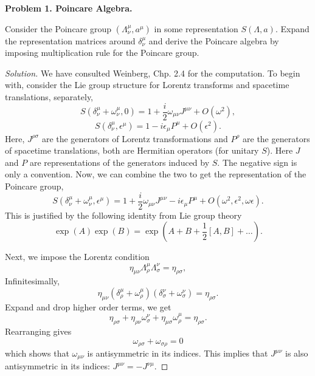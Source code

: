 
\textbf{Problem 1. Poincare Algebra.}

Consider the Poincare group $(\Lambda^\mu_ \nu, a^\mu)$ in some representation $S(\Lambda, a)$. Expand the representation matrices around $\delta^\mu _ \nu$ and derive the Poincare algebra by imposing multiplication rule for the Poincare group.

\begin{proof}[Solution]
	We have consulted Weinberg, Chp. 2.4 for the computation. To begin with, consider the Lie group structure for Lorentz transforms and spacetime translations, separately,
	\[
	S(\delta^\mu _ \nu + \omega^\mu _ \nu, 0) = 1 + \frac{i}{2} \omega_{\mu \nu} J^{\mu \nu} + O(\omega^2),
	\]
	\[
	S(\delta^\mu _ \nu, \epsilon^\mu) = 1 - i \epsilon_\mu P^\mu + O(\epsilon^2).
	\]
	Here, $J^{\rho \sigma}$ are the generators of Lorentz transformations and $P^\rho$ are the generators of spacetime translations, both are Hermitian operators (for unitary $S$). Here $J$ and $P$ are representations of the generators induced by $S$. The negative sign is only a convention. Now, we can combine the two to get the representation of the Poincare group,
	\[
	S(\delta^\mu _ \nu + \omega^\mu _ \nu, \epsilon^\mu) = 1 + \frac{i}{2} \omega_{\mu \nu} J^{\mu \nu} - i \epsilon_\mu P^\mu + O(\omega^2, \epsilon^2, \omega \epsilon).
	\]
	This is justified by the following identity from Lie group theory
	\[
	\exp(A) \exp(B) = \exp\left(A + B + \frac{1}{2}[A, B] + \ldots\right).
	\]

	Next, we impose the Lorentz condition
	\[
	\eta_{\mu \nu} \Lambda^\mu _ \rho \Lambda^\nu _ \sigma = \eta_{\rho \sigma},
	\]
	Infinitesimally, 
	\[
	\eta_{\mu \nu} (\delta^\mu _ \rho + \omega^\mu _ \rho)(\delta^\nu _ \sigma + \omega^\nu _ \sigma) = \eta_{\rho \sigma} .
	\]
	Expand and drop higher order terms, we get
	\[
	\eta_{\rho \sigma} + \eta_{\rho \nu} \omega^\nu _ \sigma + \eta_{\mu \sigma} \omega^\mu _ \rho = \eta_{\rho \sigma}.
	\]
	Rearranging gives
	\[
	\omega_{\rho \sigma} + \omega_{\sigma \rho} = 0
	\]
	which shows that $\omega_{\mu \nu}$ is antisymmetric in its indices. This implies that $J^{\mu \nu}$ is also antisymmetric in its indices: $J^{\mu \nu} = - J^{\nu \mu}$.


\end{proof}

